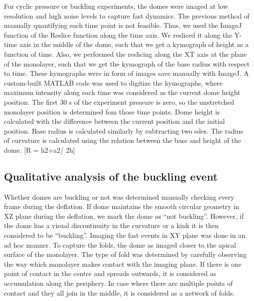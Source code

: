 For cyclic pressure or buckling experiments, the domes were imaged at
low resolution and high noise levels to capture fast dynamics. The
previous method of manually quantifying each time point is not feasible.
Thus, we used the ImageJ function of the Reslice function along the time
axis. We resliced it along the Y-time axis in the middle of the dome,
such that we get a kymograph of height as a function of time. Also, we
performed the reslicing along the XT axis at the plane of the monolayer,
such that we get the kymograph of the base radius with respect to time.
These kymographs were in form of images save manually with ImageJ. A
custom-built MATLAB code was used to digitize the kymographs, where
maximum intensity along each time was considered as the current dome
height position. The first 30 s of the experiment pressure is zero, so
the unstretched monolayer position is determined fom those time points.
Dome height is calculated with the difference between the current
position and the initial position. Base radius is calculated similarly
by subtracting two sdes. The radius of curvature is calculated using the
relation between the base and height of the dome. {[}R = h2+a2/ 2h{]}

\hypertarget{qualitative-analysis-of-the-buckling-event}{%
	\subsection{Qualitative analysis of the buckling
		event}\label{qualitative-analysis-of-the-buckling-event}}

Whether domes are buckling or not was determined manually checking every
frame during the deflation. If dome maintains the smooth circular
geometry in XZ plane during the deflation, we mark the dome as ``not
buckling''. However, if the dome has a visual discontinuity in the
curvature or a kink it is then considered to be ``buckling''. Imaging
the fast events in XY plane was done in an ad hoc manner. To capture the
folds, the dome as imaged closer to the apical surface of the monolayer.
The type of fold was determined by carefully observing the way which
monolayer makes contact with the imaging plane. If there is one point of
contact in the centre and spreads outwards, it is considered as
accumulation along the periphery. In case where there are multiple
points of contact and they all join in the middle, it is considered as a
network of folds.
